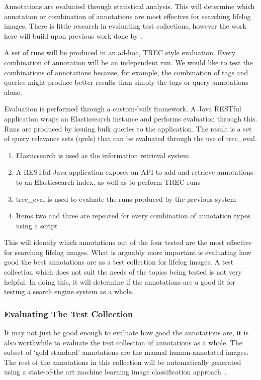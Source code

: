Annotations are evaluated through statistical analysis. This will determine which annotation or combination of annotations are most effective for searching lifelog images. There is little research in evaluating test collections, however the work here will build upon previous work done by .

A set of runs will be produced in an ad-hoc, TREC style evaluation. Every combination of annotation will be an independent run. We would like to test the combinations of annotations because, for example, the combination of tags and queries might produce better results than simply the tags or query annotations alone.

Evaluation is performed through a custom-built framework. A Java RESTful application wraps an Elasticsearch instance and performs evaluation through this. Runs are produced by issuing bulk queries to the application. The result is a set of query relevance sets (qrels) that can be evaluated through the use of trec\_eval.

\begin{enumerate}
    \item Elasticsearch is used as the information retrieval system
    \item A RESTful Java application exposes an API to add and retrieve annotations to an Elasticsearch index, as well as to perform TREC runs
    \item trec\_eval is used to evaluate the runs produced by the previous system
    \item Items two and three are repeated for every combination of annotation types using a script
\end{enumerate}

This will identify which annotations out of the four tested are the most effective for searching lifelog images. What is arguably more important is evaluating how good the best annotations are as a test collection for lifelog images. A test collection which does not suit the needs of the topics being tested is not very helpful. In doing this, it will determine if the annotations are a good fit for testing a search engine system as a whole.

\subsubsection{Evaluating The Test Collection}

It may not just be good enough to evaluate how good the annotations are, it is also worthwhile to evaluate the test collection of annotations as a whole. The subset of `gold standard' annotations are the manual human-annotated images. The rest of the annotations in this collection will be automatically generated using a state-of-the art machine learning image classification approach~\citep{karpathy2015deep}.
